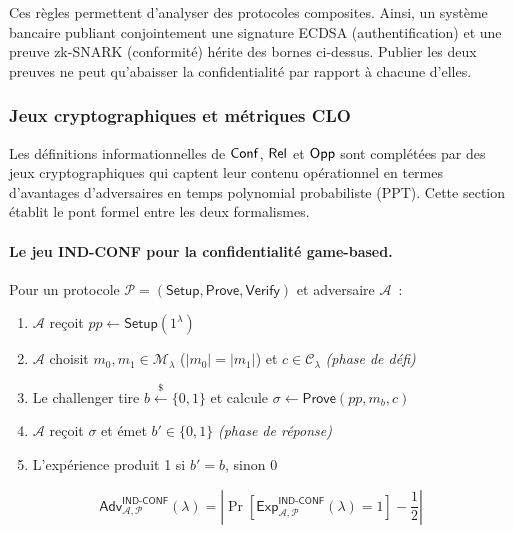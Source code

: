\begin{sloppypar}
Ces r\`egles permettent d'analyser des protocoles composites. Ainsi, un syst\`eme
bancaire publiant conjointement une signature ECDSA (authentification) et une preuve zk-SNARK
(conformit\'e) h\'erite des bornes ci-dessus. Publier les deux preuves ne peut
qu'abaisser la confidentialit\'e par rapport \`a chacune d'elles.

\subsubsection{Jeux cryptographiques et m\'etriques CLO}
\label{subsubsec:jeux_crypto}

Les d\'efinitions informationnelles de $\mathsf{Conf}$, $\mathsf{Rel}$ et $\mathsf{Opp}$ sont
compl\'et\'ees par des jeux cryptographiques qui captent leur contenu
op\'erationnel en termes d'avantages d'adversaires en temps polynomial probabiliste (PPT). Cette section
\'etablit le pont formel entre les deux formalismes.

\paragraph{Le jeu IND-CONF pour la confidentialit\'e game-based.}
\label{subsubsubsec:jeu_ind_conf}

\begin{definition}\label{def:jeu_ind_conf}
Pour un protocole $\mathcal{P} = (\mathsf{Setup},\mathsf{Prove},
\mathsf{Verify})$ et adversaire $\mathcal{A}$~:
\begin{enumerate}
\item $\mathcal{A}$ re\c{c}oit $pp \leftarrow \mathsf{Setup}(1^\lambda)$
\item $\mathcal{A}$ choisit $m_0,m_1 \in \mathcal{M}_\lambda$
      ($|m_0|=|m_1|$) et $c \in \mathcal{C}_\lambda$
      \hfill\textit{(phase de d\'efi)}
\item Le challenger tire $b \xleftarrow{\$} \{0,1\}$ et calcule
      $\sigma \leftarrow \mathsf{Prove}(pp, m_b, c)$
\item $\mathcal{A}$ re\c{c}oit $\sigma$ et \'emet $b' \in \{0,1\}$
      \hfill\textit{(phase de r\'eponse)}
\item L'exp\'erience produit 1 si $b' = b$, sinon 0
\end{enumerate}
\begin{equation}
\mathsf{Adv}^{\mathsf{IND\text{-}CONF}}_{\mathcal{A},\mathcal{P}}(\lambda)
= \left|\Pr\!\left[
\mathsf{Exp}^{\mathsf{IND\text{-}CONF}}_{\mathcal{A},\mathcal{P}}(\lambda)
= 1\right] - \frac{1}{2}\right|
\end{equation}
\end{definition}


\end{sloppypar}
